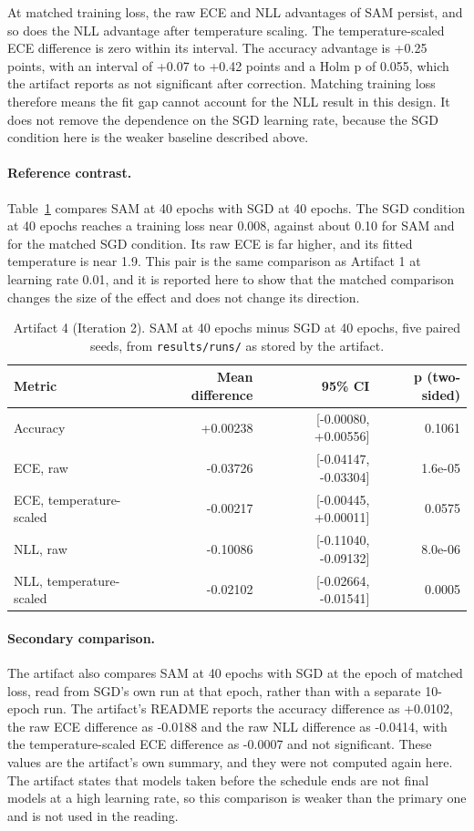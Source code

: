 \documentclass[11pt,letterpaper]{article}
\begin{document}
At matched training loss, the raw ECE and NLL advantages of SAM persist, and so does the NLL advantage after temperature scaling. The temperature-scaled ECE difference is zero within its interval. The accuracy advantage is +0.25 points, with an interval of +0.07 to +0.42 points and a Holm p of 0.055, which the artifact reports as not significant after correction. Matching training loss therefore means the fit gap cannot account for the NLL result in this design. It does not remove the dependence on the SGD learning rate, because the SGD condition here is the weaker baseline described above.

\paragraph{Reference contrast.} Table~\ref{tab:ref4} compares SAM at 40 epochs with SGD at 40 epochs. The SGD condition at 40 epochs reaches a training loss near 0.008, against about 0.10 for SAM and for the matched SGD condition. Its raw ECE is far higher, and its fitted temperature is near 1.9. This pair is the same comparison as Artifact 1 at learning rate 0.01, and it is reported here to show that the matched comparison changes the size of the effect and does not change its direction.

\begin{table}[!htbp]
\centering
\footnotesize
\caption{Artifact 4 (Iteration 2). SAM at 40 epochs minus SGD at 40 epochs, five paired seeds, from \texttt{results/runs/} as stored by the artifact.}
\label{tab:ref4}
\begin{tabular}{lrrr}
\toprule
Metric & Mean difference & 95\% CI & p (two-sided) \\
\midrule
Accuracy & +0.00238 & [-0.00080, +0.00556] & 0.1061 \\
ECE, raw & -0.03726 & [-0.04147, -0.03304] & 1.6e-05 \\
ECE, temperature-scaled & -0.00217 & [-0.00445, +0.00011] & 0.0575 \\
NLL, raw & -0.10086 & [-0.11040, -0.09132] & 8.0e-06 \\
NLL, temperature-scaled & -0.02102 & [-0.02664, -0.01541] & 0.0005 \\
\bottomrule
\end{tabular}
\end{table}

\paragraph{Secondary comparison.} The artifact also compares SAM at 40 epochs with SGD at the epoch of matched loss, read from SGD's own run at that epoch, rather than with a separate 10-epoch run. The artifact's README reports the accuracy difference as +0.0102, the raw ECE difference as -0.0188 and the raw NLL difference as -0.0414, with the temperature-scaled ECE difference as -0.0007 and not significant. These values are the artifact's own summary, and they were not computed again here. The artifact states that models taken before the schedule ends are not final models at a high learning rate, so this comparison is weaker than the primary one and is not used in the reading.
\end{document}
